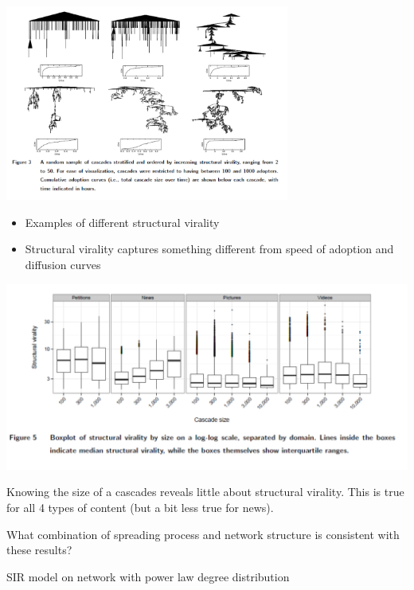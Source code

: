 \documentclass[aspectratio=169]{beamer}
\begin{document}
\begin{frame}

\begin{center}
\includegraphics[width=0.7\textwidth]{figures/goel_structural_2016_fig3}
\end{center}

\begin{itemize}
\item Examples of different structural virality \pause
\item Structural virality captures something different from speed of adoption and diffusion curves
\end{itemize}

\end{frame}
\begin{frame}

\begin{center}
\includegraphics[width=\textwidth]{figures/goel_structural_2016_fig5}
\end{center}

Knowing the size of a cascades reveals little about structural virality.  This is true for all 4 types of content (but a bit less true for news).

\end{frame}
\begin{frame}

What combination of spreading process and network structure is consistent with these results?

\pause

SIR model on network with power law degree distribution

\end{frame}
\end{document}
